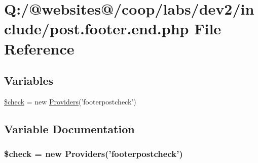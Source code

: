 \hypertarget{post_8footer_8end_8php}{\section{Q\-:/@websites@/coop/labs/dev2/include/post.footer.\-end.\-php File Reference}
\label{post_8footer_8end_8php}
}
\subsection*{Variables}
\begin{DoxyCompactItemize}
\item 
\hyperlink{post_8footer_8end_8php_a830cf70d25fefacddcf4c6bc3fd7a0e0}{\$check} = new \hyperlink{class_providers}{Providers}('footerpostcheck')
\end{DoxyCompactItemize}


\subsection{Variable Documentation}
\hypertarget{post_8footer_8end_8php_a830cf70d25fefacddcf4c6bc3fd7a0e0}{
\subsubsection[{\$check}]{\setlength{\rightskip}{0pt plus 5cm}\$check = new {\bf Providers}('footerpostcheck')}}\label{post_8footer_8end_8php_a830cf70d25fefacddcf4c6bc3fd7a0e0}
